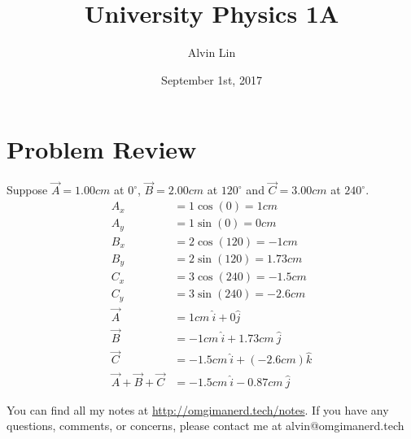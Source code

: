 \documentclass[letterpaper, 12pt]{math}
\title{University Physics 1A}
\author{Alvin Lin}
\date{September 1st, 2017}
\begin{document}
\maketitle

\section*{Problem Review}
Suppose \( \vec{A} = 1.00cm \) at \( 0^{\circ} \), \( \vec{B} = 2.00cm \) at
\( 120^{\circ} \) and \( \vec{C} = 3.00cm \) at \( 240^{\circ} \).
\begin{align*}
  A_{x} &= 1\cos(0) = 1cm \\
  A_{y} &= 1\sin(0) = 0cm \\
  B_{x} &= 2\cos(120) = -1cm \\
  B_{y} &= 2\sin(120) = 1.73 cm \\
  C_{x} &= 3\cos(240) = -1.5cm \\
  C_{y} &= 3\sin(240) =-2.6cm \\
  \vec{A} &= 1cm\ \hat{i}+0\hat{j} \\
  \vec{B} &= -1cm\ \hat{i}+1.73cm\ \hat{j} \\
  \vec{C} &= -1.5cm\ \hat{i}+(-2.6cm)\hat{k} \\
  \vec{A}+\vec{B}+\vec{C} &= -1.5cm\ \hat{i}-0.87cm\ \hat{j}
\end{align*}

\begin{center}
  You can find all my notes at \url{http://omgimanerd.tech/notes}. If you have
  any questions, comments, or concerns, please contact me at
  alvin@omgimanerd.tech
\end{center}
\end{document}
